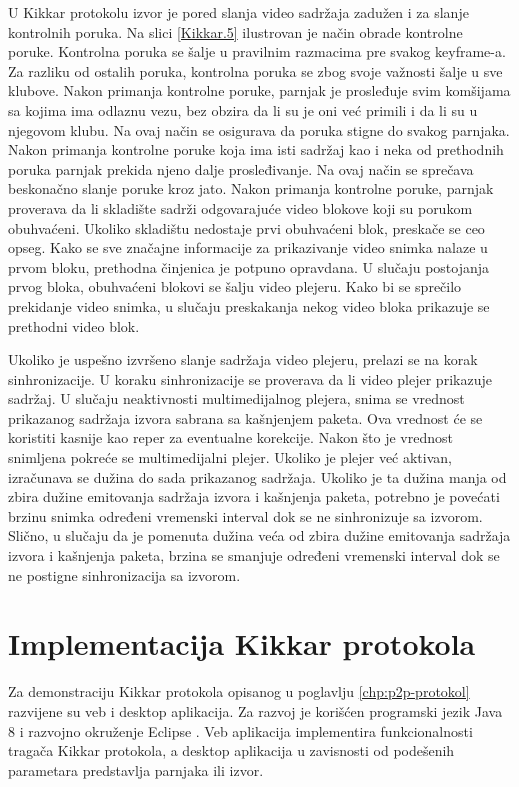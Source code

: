 \documentclass[12pt,oneside]{memoir}
\begin{document}
U Kikkar protokolu izvor je pored slanja video sadržaja zadužen i za slanje kontrolnih poruka. Na slici \ref{Kikkar.5} ilustrovan je način obrade kontrolne poruke. Kontrolna poruka se šalje u pravilnim razmacima pre svakog keyframe-a. Za razliku od ostalih poruka, kontrolna poruka se zbog svoje važnosti šalje u sve klubove. Nakon primanja kontrolne poruke, parnjak je prosleđuje svim komšijama sa kojima ima odlaznu vezu, bez obzira da li su je oni već primili i da li su u njegovom klubu. Na ovaj način se osigurava da poruka stigne do svakog parnjaka. Nakon primanja kontrolne poruke koja ima isti sadržaj kao i neka od prethodnih poruka parnjak prekida njeno dalje prosleđivanje. Na ovaj način se sprečava beskonačno slanje poruke kroz jato. Nakon primanja kontrolne poruke, parnjak proverava da li skladište sadrži odgovarajuće video blokove koji su porukom obuhvaćeni. Ukoliko skladištu nedostaje prvi obuhvaćeni blok, preskače se ceo opseg. Kako se sve značajne informacije za prikazivanje video snimka nalaze u prvom bloku, prethodna činjenica je potpuno opravdana. U slučaju postojanja prvog bloka, obuhvaćeni blokovi se šalju video plejeru. Kako bi se sprečilo prekidanje video snimka, u slučaju preskakanja nekog video bloka prikazuje se prethodni video blok.

Ukoliko je uspešno izvršeno slanje sadržaja video plejeru, prelazi se na korak sinhronizacije. U koraku sinhronizacije se proverava da li video plejer prikazuje sadržaj. U slučaju neaktivnosti multimedijalnog plejera, snima se vrednost prikazanog sadržaja izvora sabrana sa kašnjenjem paketa. Ova vrednost će se koristiti kasnije kao reper za eventualne korekcije. Nakon što je vrednost snimljena pokreće se multimedijalni plejer. Ukoliko je plejer već aktivan, izračunava se dužina do sada prikazanog sadržaja. Ukoliko je ta dužina manja od zbira dužine emitovanja sadržaja izvora i kašnjenja paketa, potrebno je povećati brzinu snimka određeni vremenski interval dok se ne sinhronizuje sa izvorom. Slično, u slučaju da je pomenuta dužina veća od zbira dužine emitovanja sadržaja izvora i kašnjenja paketa, brzina se smanjuje određeni vremenski interval dok se ne postigne sinhronizacija sa izvorom. 


\chapter{Implementacija Kikkar protokola}
\label{chp:p2p-implementacija}

Za demonstraciju Kikkar protokola opisanog u poglavlju \ref{chp:p2p-protokol} razvijene su veb i desktop aplikacija. Za razvoj je korišćen programski jezik Java 8 \cite{Java} i razvojno okruženje Eclipse \cite{Eclipse}. Veb aplikacija implementira funkcionalnosti tragača Kikkar protokola, a desktop aplikacija u zavisnosti od podešenih parametara predstavlja parnjaka ili izvor. 
\end{document}
